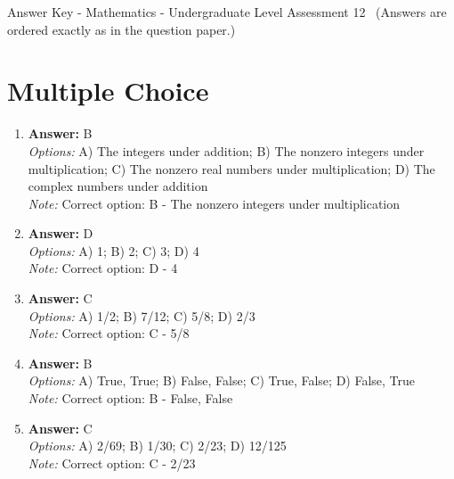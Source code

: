 \documentclass[12pt]{article}
\begin{document}
\begin{center}
Answer Key - Mathematics - Undergraduate Level Assessment 12 \
\small (Answers are ordered exactly as in the question paper.)
\end{center}

\section*{Multiple Choice}
\begin{enumerate}[label=\arabic*.]
\item \textbf{Answer:} B
\\ \textit{Options:} A) The integers under addition; B) The nonzero integers under multiplication; C) The nonzero real numbers under multiplication; D) The complex numbers under addition
\\ \textit{Note:} Correct option: B - The nonzero integers under multiplication
\item \textbf{Answer:} D
\\ \textit{Options:} A) 1; B) 2; C) 3; D) 4
\\ \textit{Note:} Correct option: D - 4
\item \textbf{Answer:} C
\\ \textit{Options:} A) 1/2; B) 7/12; C) 5/8; D) 2/3
\\ \textit{Note:} Correct option: C - 5/8
\item \textbf{Answer:} B
\\ \textit{Options:} A) True, True; B) False, False; C) True, False; D) False, True
\\ \textit{Note:} Correct option: B - False, False
\item \textbf{Answer:} C
\\ \textit{Options:} A) 2/69; B) 1/30; C) 2/23; D) 12/125
\\ \textit{Note:} Correct option: C - 2/23
\end{enumerate}
\end{document}
